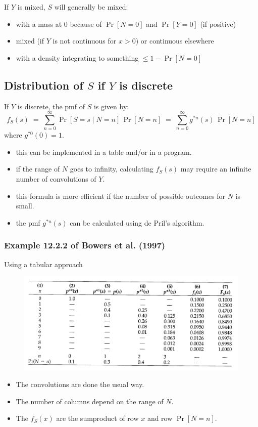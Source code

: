\documentclass[11pt]{article}
\newcommand{\noi}{\noindent}
\begin{document}
\noi If \(Y\) is mixed, \(S\) will generally be mixed:
\begin{itemize}
  \item with a mass at \(0\) because of \(\Pr[N=0]\) and \(\Pr[Y=0]\) (if positive)
  \item mixed (if \(Y\) is not continuous for \(x>0\)) or continuous elsewhere
  \item with a density integrating to something \(\le 1 - \Pr[N=0]\)
\end{itemize}


\subsection{Distribution of \(S\) if \(Y\) is discrete}

\noi If \(Y\) is discrete, the pmf of \(S\) is given by:
\[
f_S(s)
\;=\;
\sum_{n=0}^{\infty}\Pr[S = s\mid N = n]\,\Pr[N = n]
\;=\;
\sum_{n=0}^{\infty}g^{*n}(s)\,\Pr[N = n]
\tag{2}
\]
\noi where \(g^{*0}(0)=1\).

\noi
\begin{itemize}
  \item this can be implemented in a table and/or in a program.
  \item if the range of \(N\) goes to infinity, calculating \(f_S(s)\) may require an infinite number of convolutions of \(Y\).
  \item this formula is more efficient if the number of possible outcomes for \(N\) is small.
  \item the pmf \(g^{*n}(s)\) can be calculated using de Pril’s algorithm.
\end{itemize}

\subsubsection{Example 12.2.2 of Bowers et al. (1997)}
\noi Using a tabular approach
\begin{figure}[H]
    \centering
    \includegraphics[width=0.75\linewidth]{Bowers Convolution 12.2.2 Example.png}
\end{figure}
\begin{itemize}
    \item The convolutions are done the usual way.
    \item The number of columns depend on the range of $N$.
    \item The $f_S(x)$ are the sumproduct of row $x$ and row $\Pr[N=n]$.
\end{itemize} \phantom{i}
\end{document}
